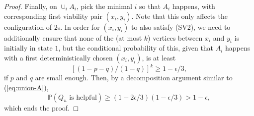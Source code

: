 \documentclass{article}
\renewcommand{\P}{\mathbb{P}}
\newcommand{\E}[0]{\mathbb{E}}
\numberwithin{equation}{section}
\begin{document}
\begin{proof}
Finally, 
on $\cup_i A_i$, pick the minimal 
$i$ so that $A_i$ happens, with corresponding first viability 
pair $(x_i,y_i)$. 
Note that this only affects the configuration of $2$s. In order for 
$(x_i,y_i)$ to also satisfy (SV2), we need to additionally ensure 
that none of the (at most 
$k$) vertices between $x_i$ and $y_i$ is initially in 
state $1$, but the conditional probability of this, 
given that $A_i$ happens with a first 
deterministically chosen $(x_i,y_i)$, is 
at least 
$$
[(1-p-q)/(1-q)]^k \ge 1-\epsilon/3, 
$$
if $p$ and $q$ are small enough. Then, by a decomposition argument similar 
to (\ref{eq:union-A}), 
$$
\P(Q_u\text{ is helpful})\ge (1-2\epsilon/3)(1-\epsilon/3)>1-\epsilon,
$$
which ends the proof.
\end{proof}


\end{document}
